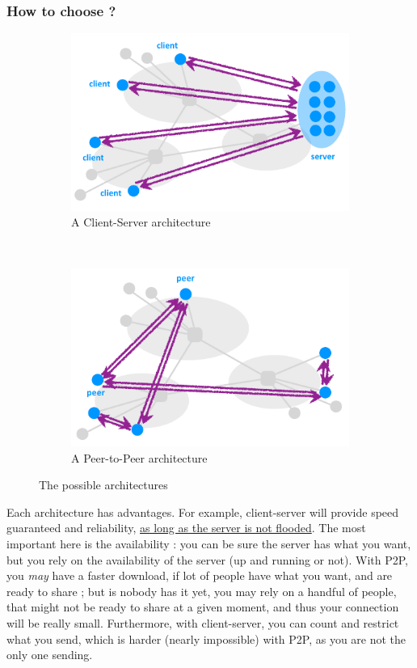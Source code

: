 \documentclass[12pt,a4paper]{article}
\begin{document}
\subsubsection{How to choose ?}
\begin{figure}[h]
	\centering
	\begin{subfigure}[b]{0.45\textwidth}
		\includegraphics[scale=0.6]{images/clientServer}
		\caption{A Client-Server architecture}
		\label{fig: client server arch}	
	\end{subfigure}
	~
	\begin{subfigure}[b]{0.45\textwidth}
		\includegraphics[scale=0.6]{images/p2p}
		\caption{A Peer-to-Peer architecture}
		\label{fig: p2p arch}
	\end{subfigure}
	\caption{The possible architectures}
	\label{figures: p2p and client-server architectures}
\end{figure}
Each architecture has advantages. For example, client-server will provide speed guaranteed and reliability, \uline{as long as the server is not flooded}. The most important here is the availability : you can be sure the server has what you want, but you rely on the availability of the server (up and running or not). With P2P, you \textit{may} have a faster download, if lot of people have what you want, and are ready to share ; but is nobody has it yet, you may rely on a handful of people, that might not be ready to share at a given moment, and thus your connection will be really small. Furthermore, with client-server, you can count and restrict what you send, which is harder (nearly impossible) with P2P, as you are not the only one sending. 
\end{document}
